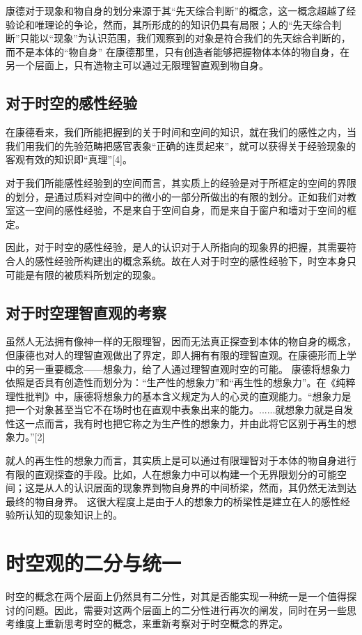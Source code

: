 \documentclass[lang=cn,11pt]{elegantpaper}
\begin{document}
康德对于现象和物自身的划分来源于其“先天综合判断”的概念，这一概念超越了经验论和唯理论的争论，然而，其所形成的的知识仍具有局限；人的“先天综合判断”只能以“现象”为认识范围，我们观察到的对象是符合我们的先天综合判断的，而不是本体的“物自身”
在康德那里，只有创造者能够把握物体本体的物自身，在另一个层面上，只有造物主可以通过无限理智直观到物自身。
\subsection{对于时空的感性经验}
在康德看来，我们所能把握到的关于时间和空间的知识，就在我们的感性之内，当我们用我们的先验范畴把感官表象“正确的连贯起来”，就可以获得关于经验现象的客观有效的知识即“真理”[4]。

对于我们所能感性经验到的空间而言，其实质上的经验是对于所框定的空间的界限的划分，是通过质料对空间中的微小的一部分所做出的有限的划分。正如我们对教室这一空间的感性经验，不是来自于空间自身，而是来自于窗户和墙对于空间的框定。

因此，对于时空的感性经验，是人的认识对于人所指向的现象界的把握，其需要符合人的感性经验所构建出的概念系统。故在人对于时空的感性经验下，时空本身只可能是有限的被质料所划定的现象。
\subsection{对于时空理智直观的考察}
虽然人无法拥有像神一样的无限理智，因而无法真正探查到本体的物自身的概念，但康德也对人的理智直观做出了界定，即人拥有有限的理智直观。在康德形而上学中的另一重要概念——想象力，给了人通过理智直观时空的可能。
康德将想象力依照是否具有创造性而划分为：“生产性的想象力”和“再生性的想象力”。在《纯粹理性批判》中，康德将想象力的基本含义规定为人的心灵的直观能力。“想象力是把一个对象甚至当它不在场时也在直观中表象出来的能力。......就想象力就是自发性这一点而言，我有时也把它称之为生产性的想象力，并由此将它区别于再生的想象力。”[2]

就人的再生性的想象力而言，其实质上是可以通过有限理智对于本体的物自身进行有限的直观探查的手段。比如，人在想象力中可以构建一个无界限划分的可能空间；这是从人的认识层面的现象界到物自身界的中间桥梁，然而，其仍然无法到达最终的物自身界。
这很大程度上是由于人的想象力的桥梁性是建立在人的感性经验所认知的现象知识上的。

\section{时空观的二分与统一}
时空的概念在两个层面上仍然具有二分性，对其是否能实现一种统一是一个值得探讨的问题。因此，需要对这两个层面上的二分性进行再次的阐发，同时在另一些思考维度上重新思考时空的概念，来重新考察对于时空概念的界定。
\end{document}
